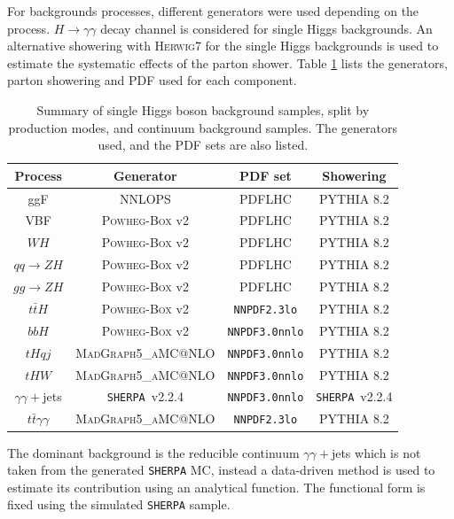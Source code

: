 For backgrounds processes, different generators were used depending on the process. $H\to\gamma\gamma$ decay channel is considered for single Higgs backgrounds. An alternative showering with \textsc{Herwig}7 for the single Higgs backgrounds is used to estimate the systematic effects of the parton shower. Table \ref{tab:HHyybb:Data&MC:Samples} lists the generators, parton showering and PDF used for each component. 
\begin{table}[htbp]
  \centering
    \begin{tabular}{ cccc }
    \hline\hline
    Process & Generator & PDF set  & Showering    \\
       \hline\hline
        ggF  & NNLOPS & PDFLHC &  \textsc{PYTHIA} 8.2  \\
        VBF & \textsc{Powheg-Box} v2 & PDFLHC  &  \textsc{PYTHIA} 8.2        \\
        $WH$ & \textsc{Powheg-Box} v2 & PDFLHC  &  \textsc{PYTHIA} 8.2 \\
        $qq\to ZH$ & \textsc{Powheg-Box} v2 &  PDFLHC  &  \textsc{PYTHIA} 8.2 \\
        $gg\to ZH$ &  \textsc{Powheg-Box} v2 & PDFLHC  &  \textsc{PYTHIA} 8.2  \\
        $t\bar{t}H$ & \textsc{Powheg-Box} v2 & \texttt{NNPDF2.3lo} & \textsc{PYTHIA} 8.2  \\
        $bbH$ &  \textsc{Powheg-Box} v2 & \texttt{NNPDF3.0nnlo}  &  \textsc{PYTHIA} 8.2     \\
        $tHqj$ & \textsc{MadGraph5\_aMC@NLO} &  \texttt{NNPDF3.0nnlo}  & \textsc{PYTHIA} 8.2   \\
        $tHW$  & \textsc{MadGraph5\_aMC@NLO} &  \texttt{NNPDF3.0nnlo}  & \textsc{PYTHIA} 8.2   \\
         $\gamma\gamma+$jets &   \texttt{SHERPA}~v2.2.4 & \texttt{NNPDF3.0nnlo}  &  \texttt{SHERPA}~v2.2.4  \\
         $t\bar{t} \gamma \gamma$ & \textsc{MadGraph5\_aMC@NLO}  &  \texttt{NNPDF2.3lo} & \textsc{PYTHIA} 8.2 \\
        \hline\hline
    \end{tabular}
    \caption{Summary of single Higgs boson background samples, split by production modes, and continuum background samples. The generators used, and the PDF sets are also listed. }
  \label{tab:HHyybb:Data&MC:Samples}
\end{table}

The dominant background is the reducible continuum $\gamma\gamma+$jets which is not taken from the generated \texttt{SHERPA} MC, instead a data-driven method is used to estimate its contribution using an analytical function. The functional form is fixed using the simulated \texttt{SHERPA} sample.


